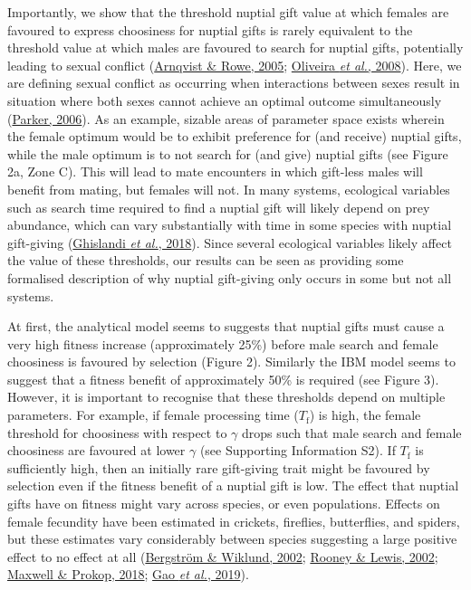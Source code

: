 \documentclass[
]{article}
\begin{document}
Importantly, we show that the threshold nuptial gift value at which
females are favoured to express choosiness for nuptial gifts is rarely
equivalent to the threshold value at which males are favoured to search
for nuptial gifts, potentially leading to sexual conflict
(\protect\hyperlink{ref-Arnqvist2005a}{Arnqvist \& Rowe, 2005};
\protect\hyperlink{ref-Oliveira2008}{Oliveira \emph{et al.}, 2008}).
Here, we are defining sexual conflict as occurring when interactions
between sexes result in situation where both sexes cannot achieve an
optimal outcome simultaneously
(\protect\hyperlink{ref-Parker2006}{Parker, 2006}). As an example,
sizable areas of parameter space exists wherein the female optimum would
be to exhibit preference for (and receive) nuptial gifts, while the male
optimum is to not search for (and give) nuptial gifts (see Figure 2a,
Zone C). This will lead to mate encounters in which gift-less males will
benefit from mating, but females will not. In many systems, ecological
variables such as search time required to find a nuptial gift will
likely depend on prey abundance, which can vary substantially with time
in some species with nuptial gift-giving
(\protect\hyperlink{ref-Ghislandi2018}{Ghislandi \emph{et al.}, 2018}).
Since several ecological variables likely affect the value of these
thresholds, our results can be seen as providing some formalised
description of why nuptial gift-giving only occurs in some but not all
systems.

At first, the analytical model seems to suggests that nuptial gifts must
cause a very high fitness increase (approximately 25\%) before male
search and female choosiness is favoured by selection (Figure 2).
Similarly the IBM model seems to suggest that a fitness benefit of
approximately 50\% is required (see Figure 3). However, it is important
to recognise that these thresholds depend on multiple parameters. For
example, if female processing time (\(T_{\mathrm{f}}\)) is high, the
female threshold for choosiness with respect to \(\gamma\) drops such
that male search and female choosiness are favoured at lower \(\gamma\)
(see Supporting Information S2). If \(T_{\mathrm{f}}\) is sufficiently
high, then an initially rare gift-giving trait might be favoured by
selection even if the fitness benefit of a nuptial gift is low. The
effect that nuptial gifts have on fitness might vary across species, or
even populations. Effects on female fecundity have been estimated in
crickets, fireflies, butterflies, and spiders, but these estimates vary
considerably between species suggesting a large positive effect to no
effect at all (\protect\hyperlink{ref-Bergstrom2002}{Bergström \&
Wiklund, 2002}; \protect\hyperlink{ref-Rooney2002}{Rooney \& Lewis,
2002}; \protect\hyperlink{ref-Maxwell2018}{Maxwell \& Prokop, 2018};
\protect\hyperlink{ref-Gao2019}{Gao \emph{et al.}, 2019}).
\end{document}

